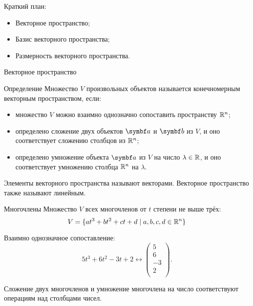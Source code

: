 
\begin{frame} %


\end{frame}



\begin{frame}{Краткий план:}
  \begin{itemize}[<+->]
    \item Векторное пространство;
    \item Базис векторного пространства;
    \item Размерность векторного пространства.
  \end{itemize}

\end{frame}


\begin{frame}{Векторное пространство}

\begin{block}{Определение} 
Множество $V$ произвольных объектов называется \alert{конечномерным векторным пространством}, если:

\begin{itemize}[<+->]
\item множество $V$ можно взаимно однозначно сопоставить пространству $\mathbb{R}^n$;
\item определено сложение двух объектов $\ba$ и $\bb$ из $V$, 
и оно соответствует сложению столбцов из $\mathbb{R}^n$;
\item определено умножение объекта $\ba$ из $V$ на число $\lambda\in \mathbb{R}$, 
и оно соответствует умножению столбца $\mathbb{R}^n$ на $\lambda$.
\end{itemize}
\end{block}

Элементы векторного пространства называют векторами. 
\pause
Векторное пространство также называют \alert{линейным}.

\end{frame}



\begin{frame}{Многочлены}
Множество $V$ всех многочленов от $t$ степени не выше трёх:
\[
V  = \{ at^3 + bt^2 + ct + d \mid a, b, c, d \in \mathbb{R}^n \}
\]

\pause
Взаимно однозначное сопоставление: 
\[5t^3 + 6t^2 - 3t + 2 \leftrightarrow \begin{pmatrix} 
    5 \\
    6 \\
    -3 \\
    2 \\
\end{pmatrix}.
\]
\pause


Сложение двух многочленов и умножение многочлена на число соответствуют операциям над столбцами чисел.
\end{frame}




